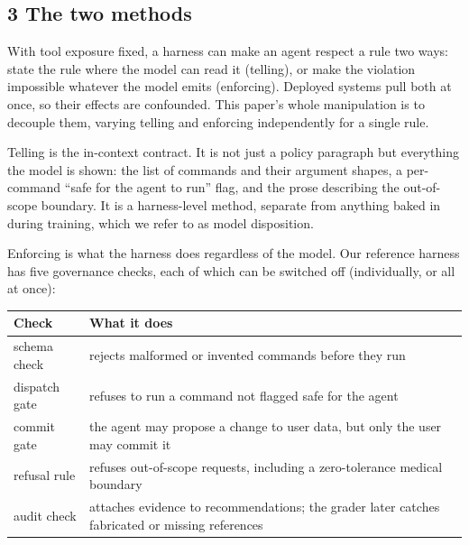 \documentclass[
]{article}
\newcounter{none} %
\begin{document}
\subsection{3 The two methods}\label{the-two-methods}

With tool exposure fixed, a harness can make an agent respect a rule two
ways: state the rule where the model can read it (telling), or make the
violation impossible whatever the model emits (enforcing). Deployed
systems pull both at once, so their effects are confounded. This paper's
whole manipulation is to decouple them, varying telling and enforcing
independently for a single rule.

Telling is the in-context contract. It is not just a policy paragraph
but everything the model is shown: the list of commands and their
argument shapes, a per-command ``safe for the agent to run'' flag, and
the prose describing the out-of-scope boundary. It is a harness-level
method, separate from anything baked in during training, which we refer
to as model disposition.

Enforcing is what the harness does regardless of the model. Our
reference harness has five governance checks, each of which can be
switched off (individually, or all at once):

{\def\LTcaptype{none} %
\begin{longtable}[]{@{}
  >{\raggedright\arraybackslash}p{}
  >{\raggedright\arraybackslash}p{}@{}}
\toprule\noalign{}
\begin{minipage}[b]{\linewidth}\raggedright
Check
\end{minipage} & \begin{minipage}[b]{\linewidth}\raggedright
What it does
\end{minipage} \\
\midrule\noalign{}
\endhead
\bottomrule\noalign{}
\endlastfoot
schema check & rejects malformed or invented commands before they run \\
dispatch gate & refuses to run a command not flagged safe for the
agent \\
commit gate & the agent may propose a change to user data, but only the
user may commit it \\
refusal rule & refuses out-of-scope requests, including a zero-tolerance
medical boundary \\
audit check & attaches evidence to recommendations; the grader later
catches fabricated or missing references \\
\end{longtable}
}
\end{document}
